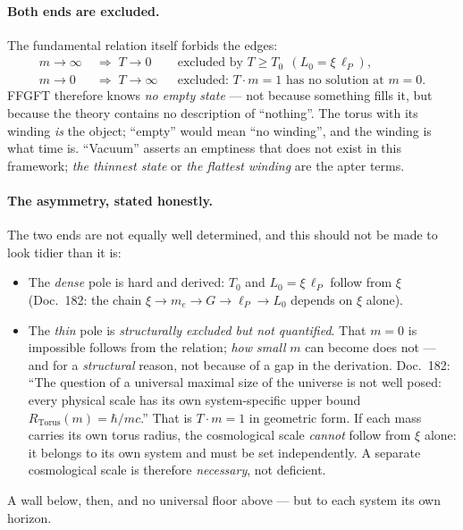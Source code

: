 \paragraph{Both ends are excluded.} The fundamental relation itself forbids the edges:
\begin{align}
m \to \infty \;&\Rightarrow\; T \to 0 && \text{excluded by } T \ge T_0 \ \ (L_0 = \xi\,\ell_P),\\
m \to 0 \;&\Rightarrow\; T \to \infty && \text{excluded: } T\cdot m = 1 \text{ has no solution at } m=0.
\end{align}
FFGFT therefore knows \emph{no empty state} --- not because something fills it, but because the
theory contains no description of \enquote{nothing}. The torus with its winding \emph{is} the
object; \enquote{empty} would mean \enquote{no winding}, and the winding is what time is.
\enquote{Vacuum} asserts an emptiness that does not exist in this framework; \emph{the thinnest
state} or \emph{the flattest winding} are the apter terms.

\paragraph{The asymmetry, stated honestly.} The two ends are not equally well determined, and this
should not be made to look tidier than it is:
\begin{itemize}
\item The \emph{dense} pole is hard and derived: $T_0$ and $L_0=\xi\,\ell_P$ follow from $\xi$
(Doc.~182: the chain $\xi \to m_e \to G \to \ell_P \to L_0$ depends on $\xi$ alone).
\item The \emph{thin} pole is \emph{structurally excluded but not quantified}. That $m=0$ is
impossible follows from the relation; \emph{how small} $m$ can become does not --- and for a
\emph{structural} reason, not because of a gap in the derivation. Doc.~182: \enquote{The question of
a universal maximal size of the universe is not well posed: every physical scale has its own
system-specific upper bound $R_\text{Torus}(m) = \hbar/mc$.} That is $T\cdot m = 1$ in geometric
form. If each mass carries its own torus radius, the cosmological scale \emph{cannot} follow from
$\xi$ alone: it belongs to its own system and must be set independently. A separate cosmological
scale is therefore \emph{necessary}, not deficient.
\end{itemize}
A wall below, then, and no universal floor above --- but to each system its own horizon.


